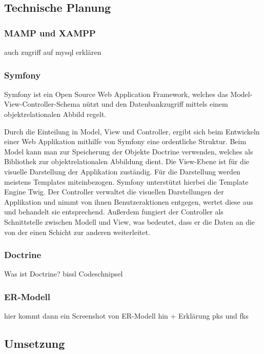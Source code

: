   \subsection{Technische Planung}

    \subsubsection{MAMP und XAMPP}

auch zugriff auf mysql erklären

    \subsubsection{Symfony}
    
Symfony ist ein Open Source Web Application Framework, welches das Model-View-Controller-Schema nützt und den Datenbankzugriff mittels einem objektrelationalen Abbild regelt. 

Durch die Einteilung in Model, View und Controller, ergibt sich beim Entwickeln einer Web Applikation mithilfe von Symfony eine ordentliche Struktur. 
Beim Model kann man zur Speicherung der Objekte Doctrine verwenden, welches als Bibliothek zur objektrelationalen Abbildung dient.
Die View-Ebene ist für die visuelle Darstellung der Applikation zuständig. Für die  Darstellung werden meistens Templates miteinbezogen. Symfony unterstützt hierbei die Template Engine Twig. 
Der Controller verwaltet die visuellen Darstellungen der Applikation und nimmt von ihnen Benutzeraktionen entgegen, wertet diese aus und behandelt sie entsprechend. Außerdem fungiert der Controller als Schnittstelle zwischen Modell und View, was bedeutet, dass er die Daten an die von der einen Schicht zur anderen weiterleitet.


    \subsubsection{Doctrine}

Was ist Doctrine?
bissl Codeschnipsel

    \subsubsection{ER-Modell}

hier kommt dann ein Screenshot von ER-Modell hin + Erklärung pks und fks

  \subsection{Umsetzung}
  
